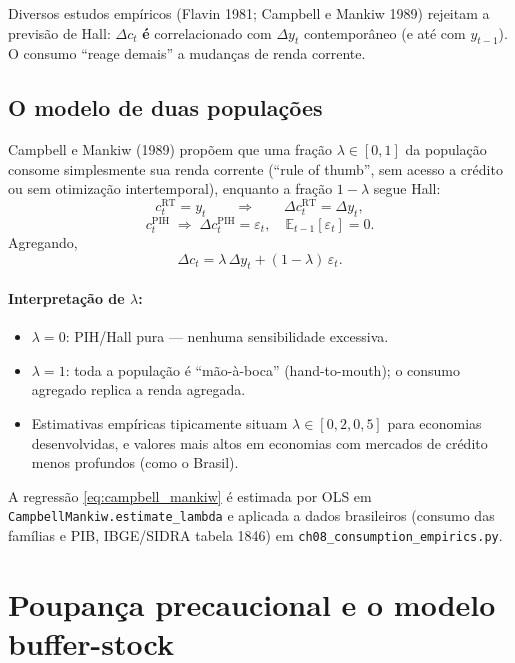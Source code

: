 \documentclass[11pt,a4paper]{article}
\newcommand{\E}{\mathbb{E}}
\begin{document}
Diversos estudos empíricos (Flavin 1981; Campbell e Mankiw 1989) rejeitam
a previsão de Hall: $\Delta c_t$ \textbf{é} correlacionado com
$\Delta y_t$ contemporâneo (e até com $y_{t-1}$). O consumo ``reage demais''
a mudanças de renda corrente.

\subsection{O modelo de duas populações}

Campbell e Mankiw (1989) propõem que uma fração $\lambda \in [0,1]$ da
população consome simplesmente sua renda corrente (``rule of thumb'',
sem acesso a crédito ou sem otimização intertemporal), enquanto a fração
$1-\lambda$ segue Hall:
\[
  c_t^{\text{RT}} = y_t
  \qquad\Longrightarrow\qquad \Delta c_t^{\text{RT}} = \Delta y_t,
\]
\[
  c_t^{\text{PIH}} \;\Longrightarrow\; \Delta c_t^{\text{PIH}} = \varepsilon_t,
  \quad \E_{t-1}[\varepsilon_t] = 0.
\]
Agregando,
\begin{equation}\label{eq:campbell_mankiw}
  \boxed{\Delta c_t = \lambda\,\Delta y_t + (1-\lambda)\,\varepsilon_t.}
\end{equation}

\paragraph{Interpretação de $\lambda$:}
\begin{itemize}
  \item $\lambda = 0$: PIH/Hall pura --- nenhuma sensibilidade excessiva.
  \item $\lambda = 1$: toda a população é ``mão-à-boca'' (hand-to-mouth);
    o consumo agregado replica a renda agregada.
  \item Estimativas empíricas tipicamente situam $\lambda \in [0{,}2, 0{,}5]$
    para economias desenvolvidas, e valores mais altos em economias com
    mercados de crédito menos profundos (como o Brasil).
\end{itemize}

A regressão \eqref{eq:campbell_mankiw} é estimada por OLS em
\texttt{CampbellMankiw.estimate\_lambda} e aplicada a dados brasileiros
(consumo das famílias e PIB, IBGE/SIDRA tabela 1846) em
\texttt{ch08\_consumption\_empirics.py}.

\section{Poupança precaucional e o modelo buffer-stock}
\end{document}
